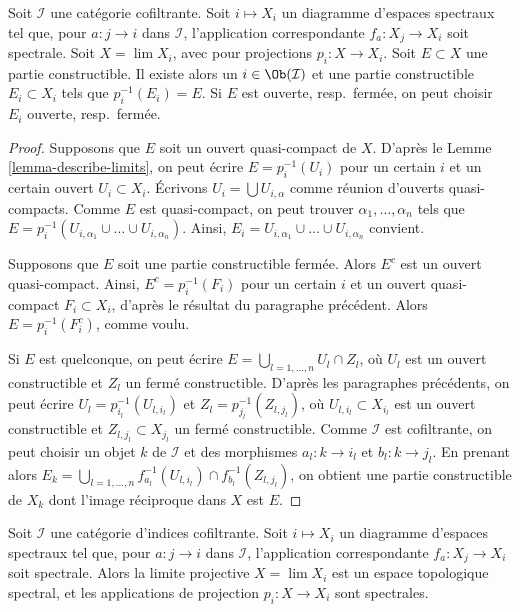 \begin{lemma}
\label{lemma-inverse-limit-spectral-spaces-constructible}
Soit $\mathcal{I}$ une catégorie cofiltrante. Soit $i \mapsto X_i$ un diagramme
d'espaces spectraux tel que, pour $a : j \to i$ dans $\mathcal{I}$,
l'application correspondante $f_a : X_j \to X_i$ soit spectrale. Soit
$X = \lim X_i$, avec pour projections $p_i : X \to X_i$. Soit
$E \subset X$ une partie constructible. Il existe alors un
$i \in \Ob(\mathcal{I})$ et une partie constructible $E_i \subset X_i$ tels que
$p_i^{-1}(E_i) = E$. Si $E$ est ouverte, resp.\ fermée, on peut choisir $E_i$
ouverte, resp.\ fermée.
\end{lemma}

\begin{proof}
Supposons que $E$ soit un ouvert quasi-compact de $X$. D'après le
Lemme \ref{lemma-describe-limits}, on peut écrire $E = p_i^{-1}(U_i)$
pour un certain $i$ et un certain ouvert $U_i \subset X_i$.
Écrivons $U_i = \bigcup U_{i, \alpha}$ comme réunion d'ouverts quasi-compacts.
Comme $E$ est quasi-compact, on peut trouver $\alpha_1, \ldots, \alpha_n$
tels que $E = p_i^{-1}(U_{i, \alpha_1} \cup \ldots \cup U_{i, \alpha_n})$.
Ainsi, $E_i = U_{i, \alpha_1} \cup \ldots \cup U_{i, \alpha_n}$ convient.

\medskip\noindent
Supposons que $E$ soit une partie constructible fermée. Alors $E^c$ est un
ouvert quasi-compact. Ainsi, $E^c = p_i^{-1}(F_i)$ pour un certain $i$ et
un ouvert quasi-compact $F_i \subset X_i$, d'après le résultat du paragraphe
précédent. Alors $E = p_i^{-1}(F_i^c)$, comme voulu.

\medskip\noindent
Si $E$ est quelconque, on peut écrire
$E = \bigcup_{l = 1, \ldots, n} U_l \cap Z_l$, où $U_l$ est un ouvert
constructible et $Z_l$ un fermé constructible. D'après les paragraphes
précédents, on peut écrire $U_l = p_{i_l}^{-1}(U_{l, i_l})$
et $Z_l = p_{j_l}^{-1}(Z_{l, j_l})$,
où $U_{l, i_l} \subset X_{i_l}$ est un ouvert constructible et
$Z_{l, j_l} \subset X_{j_l}$ un fermé constructible. Comme $\mathcal{I}$ est
cofiltrante, on peut choisir un objet $k$ de $\mathcal{I}$ et des morphismes
$a_l : k \to i_l$ et $b_l : k \to j_l$. En prenant alors
$E_k = \bigcup_{l = 1, \ldots, n}
f_{a_l}^{-1}(U_{l, i_l}) \cap f_{b_l}^{-1}(Z_{l, j_l})$,
on obtient une partie constructible de $X_k$ dont l'image réciproque dans $X$
est $E$.
\end{proof}

\begin{lemma}
\label{lemma-directed-inverse-limit-spectral-spaces}
Soit $\mathcal{I}$ une catégorie d'indices cofiltrante.
Soit $i \mapsto X_i$ un diagramme d'espaces spectraux tel
que, pour $a : j \to i$ dans $\mathcal{I}$, l'application correspondante
$f_a : X_j \to X_i$ soit spectrale. Alors la limite projective
$X = \lim X_i$ est un espace topologique spectral, et les applications de
projection $p_i : X \to X_i$ sont spectrales.
\end{lemma}

